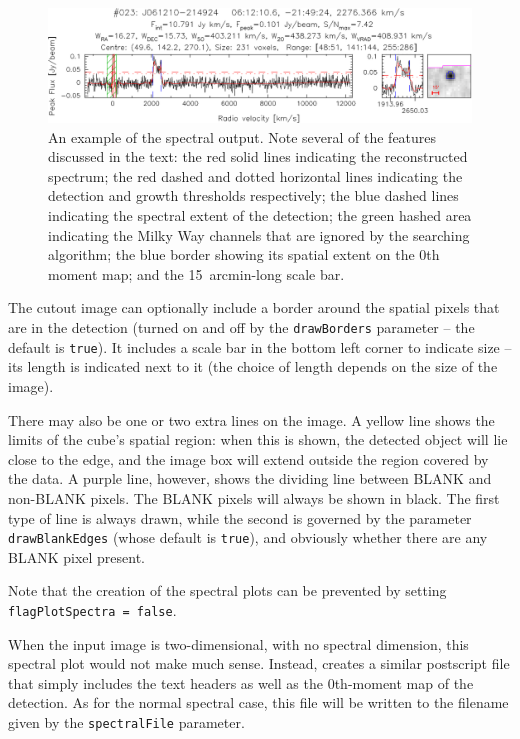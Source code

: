\begin{figure}[t]
  \begin{center}
    \includegraphics[width=\textwidth]{example_spectrum}
  \end{center}
  \caption{\footnotesize An example of the spectral output. Note
    several of the features discussed in the text: the red solid lines
    indicating the reconstructed spectrum; the red dashed and dotted
    horizontal lines indicating the detection and growth thresholds
    respectively; the blue dashed lines indicating the spectral extent
    of the detection; the green hashed area indicating the Milky Way
    channels that are ignored by the searching algorithm; the blue
    border showing its spatial extent on the 0th moment map; and the
    15~arcmin-long scale bar.}
  \label{fig-spect}
\end{figure}

The cutout image can optionally include a border around the spatial
pixels that are in the detection (turned on and off by the
\texttt{drawBorders} parameter -- the default is \texttt{true}). It
includes a scale bar in the bottom left corner to indicate size -- its
length is indicated next to it (the choice of length depends on the
size of the image).

There may also be one or two extra lines on the image. A yellow line
shows the limits of the cube's spatial region: when this is shown, the
detected object will lie close to the edge, and the image box will
extend outside the region covered by the data. A purple line, however,
shows the dividing line between BLANK and non-BLANK pixels. The BLANK
pixels will always be shown in black. The first type of line is always
drawn, while the second is governed by the parameter
\texttt{drawBlankEdges} (whose default is \texttt{true}), and
obviously whether there are any BLANK pixel present.

Note that the creation of the spectral plots can be prevented by
setting \texttt{flagPlotSpectra = false}.


When the input image is two-dimensional, with no spectral dimension,
this spectral plot would not make much sense. Instead, \duchamp
creates a similar postscript file that simply includes the text
headers as well as the 0th-moment map of the detection. As for the
normal spectral case, this file will be written to the filename given
by the \texttt{spectralFile} parameter.

